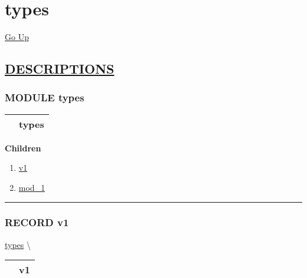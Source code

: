 \chapter*{\color{headfile}
types
}
\hypertarget{ecldoc:toc:types}{}
\hyperlink{ecldoc:toc:root}{Go Up}


\section*{\underline{\textsf{DESCRIPTIONS}}}
\subsection*{\textsf{\colorbox{headtoc}{\color{white} MODULE}
types}}

\hypertarget{ecldoc:types}{}

{\renewcommand{\arraystretch}{1.5}
\begin{tabularx}{\textwidth}{|>{\raggedright\arraybackslash}l|X|}
\hline
\hspace{0pt}\mytexttt{\color{red} } & \textbf{types} \\
\hline
\end{tabularx}
}

\par


\textbf{Children}
\begin{enumerate}
\item \hyperlink{ecldoc:types.v1}{v1}
\item \hyperlink{ecldoc:types.mod_1}{mod\_1}
\end{enumerate}

\rule{\linewidth}{0.5pt}

\subsection*{\textsf{\colorbox{headtoc}{\color{white} RECORD}
v1}}

\hypertarget{ecldoc:types.v1}{}
\hspace{0pt} \hyperlink{ecldoc:types}{types} \textbackslash 

{\renewcommand{\arraystretch}{1.5}
\begin{tabularx}{\textwidth}{|>{\raggedright\arraybackslash}l|X|}
\hline
\hspace{0pt}\mytexttt{\color{red} } & \textbf{v1} \\
\hline
\end{tabularx}
}

\par


